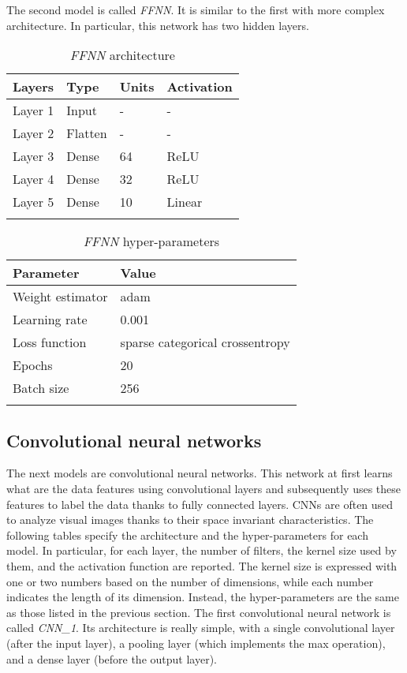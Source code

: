\newpage

The second model is called \emph{FFNN}. It is similar to the first with
more complex architecture. In particular, this network has two hidden
layers.

\begin{longtable}[]{@{}llll@{}}
	\toprule
	\textbf{Layers} & \textbf{Type} & \textbf{Units} & \textbf{Activation}\tabularnewline
	\midrule
	\endhead
	Layer 1 & Input & - & -\tabularnewline
	Layer 2 & Flatten & - & -\tabularnewline
	Layer 3 & Dense & 64 & ReLU\tabularnewline
	Layer 4 & Dense & 32 & ReLU\tabularnewline
	Layer 5 & Dense & 10 & Linear\tabularnewline
	\bottomrule
	\caption{\emph{FFNN} architecture}
\end{longtable}

\begin{longtable}[]{@{}ll@{}}
	\toprule
	\textbf{Parameter} & \textbf{Value}\tabularnewline
	\midrule
	\endhead
	Weight estimator & adam\tabularnewline
	Learning rate & 0.001\tabularnewline
	Loss function & sparse categorical crossentropy\tabularnewline
	Epochs & 20\tabularnewline
	Batch size & 256\tabularnewline
	\bottomrule
	\caption{\emph{FFNN} hyper-parameters}
\end{longtable}

\subsection{Convolutional neural networks}\label{header-n186}

The next models are convolutional neural networks. This network at first
learns what are the data features using convolutional layers and
subsequently uses these features to label the data thanks to fully
connected layers. CNNs are often used to analyze visual images thanks to
their space invariant characteristics. The following tables specify the
architecture and the hyper-parameters for each model. In particular, for
each layer, the number of filters, the kernel size used by them, and the
activation function are reported. The kernel size is expressed with one
or two numbers based on the number of dimensions, while each number
indicates the length of its dimension. Instead, the hyper-parameters are
the same as those listed in the previous section.
\newpage
The first convolutional neural network is called \emph{CNN\_1}. Its
architecture is really simple, with a single convolutional layer (after
the input layer), a pooling layer (which implements the max operation),
and a dense layer (before the output layer).

